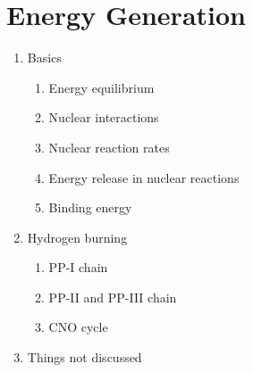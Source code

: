 \documentclass{article}
\begin{document}
\section{Energy Generation}
\begin{enumerate}
    \item Basics
        \begin{enumerate}
            \item Energy equilibrium
            \item Nuclear interactions
            \item Nuclear reaction rates
            \item Energy release in nuclear reactions
            \item Binding energy
        \end{enumerate}
    \item Hydrogen burning
        \begin{enumerate}
            \item PP-I chain
            \item PP-II and PP-III chain
            \item CNO cycle
        \end{enumerate}
    \item Things not discussed
\end{enumerate}
\end{document}
